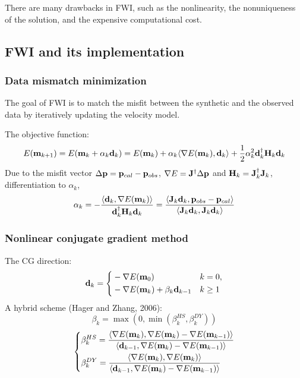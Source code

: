 There are many drawbacks in FWI, such as the nonlinearity,
the nonuniqueness of the solution, and the expensive computational cost.

\subsection{FWI and its implementation}

\subsubsection{Data mismatch minimization}
The goal of FWI is to match the misfit between the synthetic and
the observed data by iteratively updating the velocity model.

The objective function:
\[ E(\mathbf{m}_{k+1}) = E(\mathbf{m}_k+\alpha_k\mathbf{d}_k) = E(\mathbf{m}_k) +
  \alpha_k\langle\nabla E(\mathbf{m}_k),\mathbf{d}_k\rangle +
  \frac{1}{2}\alpha_k^2\mathbf{d}_k^\dagger\mathbf{H}_k\mathbf{d}_k \]
Due to the misfit vector $\Delta\mathbf{p}=\mathbf{p}_{cal}-\mathbf{p}_{obs}$,
$\nabla E=\mathbf{J}^\dagger\Delta\mathbf{p}$ and $\mathbf{H}_k=\mathbf{J}_k^\dagger\mathbf{J}_k$,
differentiation to $\alpha_k$,
\[ \alpha_k = -\frac{\langle\mathbf{d}_k, \nabla E(\mathbf{m}_k)\rangle}
  {\mathbf{d}_k^\dagger\mathbf{H}_k\mathbf{d}_k} =
  \frac{\langle\mathbf{J}_k\mathbf{d}_k, \mathbf{p}_{obs}-\mathbf{p}_{cal}\rangle}
  {\langle\mathbf{J}_k\mathbf{d}_k, \mathbf{J}_k\mathbf{d}_k\rangle} \]

\subsubsection{Nonlinear conjugate gradient method}
The CG direction:
\[ \mathbf{d}_k=\left\{
  \begin{aligned}
    & -\nabla E(\mathbf{m}_0) & & k=0, \\
    & -\nabla E(\mathbf{m}_k)+\beta_k\mathbf{d}_{k-1} & & k\geq 1 \\
  \end{aligned} \right. \]
A hybrid scheme (Hager and Zhang, 2006):
\[ \beta_k = \max(0,\min(\beta_k^{HS},\beta_k^{DY})) \]
\[ \left\{
  \begin{aligned}
    & \beta_k^{HS}=\frac{\langle\nabla E(\mathbf{m}_k), \nabla E(\mathbf{m}_k)-\nabla E(\mathbf{m}_{k-1})\rangle}
      {\langle\mathbf{d}_{k-1},\nabla E(\mathbf{m}_k)-\nabla E(\mathbf{m}_{k-1})\rangle} \\
    & \beta_k^{DY}=\frac{\langle\nabla E(\mathbf{m}_k), \nabla E(\mathbf{m}_k)\rangle}
      {\langle\mathbf{d}_{k-1},\nabla E(\mathbf{m}_k)-\nabla E(\mathbf{m}_{k-1})\rangle}
  \end{aligned} \right. \]

